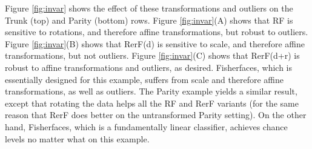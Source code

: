 \documentclass{article} %
\begin{document}
Figure \ref{fig:invar} shows the effect of these transformations and outliers on the Trunk (top) and Parity (bottom) rows. Figure \ref{fig:invar}(A) shows that RF is sensitive to rotations, and therefore affine transformations, but robust to outliers.  Figure \ref{fig:invar}(B) shows that RerF(d) is sensitive to scale, and therefore affine transformations, but not outliers.   Figure \ref{fig:invar}(C) shows that RerF(d+r) is robust to affine transformations and outliers, as desired.  Fisherfaces, which is essentially designed for this example, suffers from scale and therefore affine transformations, as well as outliers.  The Parity example yields a similar result, except that rotating the data helps all the RF and RerF variants (for the same reason that RerF does better on the untransformed Parity setting).  
On the other hand, Fisherfaces, which is a fundamentally linear classifier, achieves chance levels no matter what on this example.  


\end{document}
